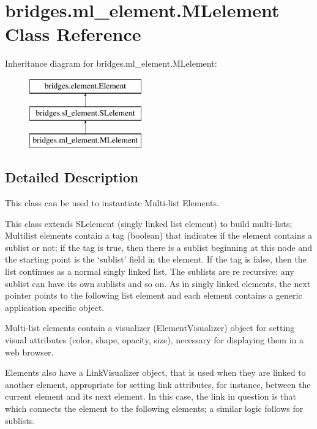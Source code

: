 \hypertarget{classbridges_1_1ml__element_1_1_m_lelement}{}\section{bridges.\+ml\+\_\+element.\+M\+Lelement Class Reference}
\label{classbridges_1_1ml__element_1_1_m_lelement}
Inheritance diagram for bridges.\+ml\+\_\+element.\+M\+Lelement\+:\begin{figure}[H]
\begin{center}
\leavevmode
\includegraphics[height=3.000000cm]{classbridges_1_1ml__element_1_1_m_lelement}
\end{center}
\end{figure}


\subsection{Detailed Description}
This class can be used to instantiate Multi-\/list Elements. 

This class extends S\+Lelement (singly linked list element) to build multi-\/lists; Multilist elements contain a tag (boolean) that indicates if the element contains a sublist or not; if the tag is true, then there is a sublist beginning at this node and the starting point is the `sublist' field in the element. If the tag is false, then the list continues as a normal singly linked list. The sublists are re recursive\+: any sublist can have its own sublists and so on. As in singly linked elements, the next pointer points to the following list element and each element contains a generic application specific object.

Multi-\/list elements contain a visualizer (Element\+Visualizer) object for setting visual attributes (color, shape, opacity, size), necessary for displaying them in a web browser.

Elements also have a Link\+Visualizer object, that is used when they are linked to another element, appropriate for setting link attributes, for instance, between the current element and its next element. In this case, the link in question is that which connects the element to the following elements; a similar logic follows for sublists.

